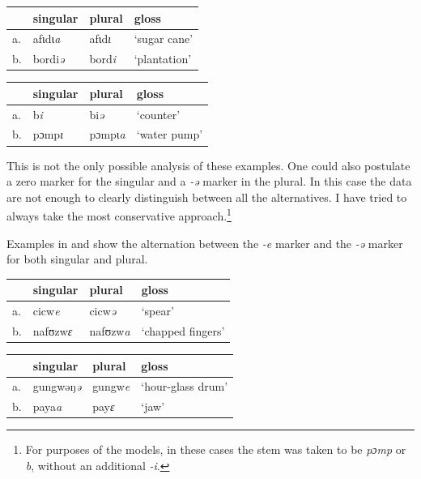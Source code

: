 \begin{exe}
    \ex \label{ipl-kasem}
    \begin{tabular}[t]{llll}
      & singular        & plural         & gloss        \\
      \midrule
      a. & afɩdɩ\textit{a} & afɩd\textit{ɩ} & `sugar cane' \\
      b. & bordi\textit{ə} & bord\textit{i} & `plantation' \\
    \end{tabular}
\end{exe}

\begin{exe}
    \ex\label{isg-kasem}
    \begin{tabular}[t]{llll}
      & singular       & plural          & gloss        \\
      \midrule
      a. & b\textit{i}    & bi\textit{ə}    & `counter'    \\
      b. & pɔmp\textit{ɩ} & pɔmpɩ\textit{a} & `water pump' \\
    \end{tabular}
\end{exe}

This is not the only possible analysis of these examples. One could also postulate a zero marker for the singular and a \textit{-ə} marker in the plural. In this case the data are not enough to clearly distinguish between all the alternatives. I have tried to always take the most conservative approach.\footnote{For purposes of the models, in these cases the stem was taken to be \textit{pɔmp} or \textit{b}, without an additional \textit{-i}.}

Examples in  and  show the alternation between the \textit{-e} marker and the \textit{-ə} marker for both singular and plural.

\begin{exe}
    \ex \label{esg-kasem}
    \begin{tabular}[t]{llll}
      & singular & plural  & gloss             \\
      \midrule
      a. & cicw\textit{e}    & cicw\textit{ə}   & `spear'           \\
      b. & nafʊzw\textit{ɛ}  & nafʊzw\textit{a} & `chapped fingers' \\
    \end{tabular}
\end{exe}

\begin{exe}
    \ex \label{epl-kasem}
    \begin{tabular}[t]{llll}
      & singular & plural & gloss             \\
      \midrule
      a. & gungwəŋ\textit{ə} & gungw\textit{e} & `hour-glass drum' \\
      b. & paya\textit{a}    & pay\textit{ɛ}   & `jaw'             \\
    \end{tabular}
\end{exe}

